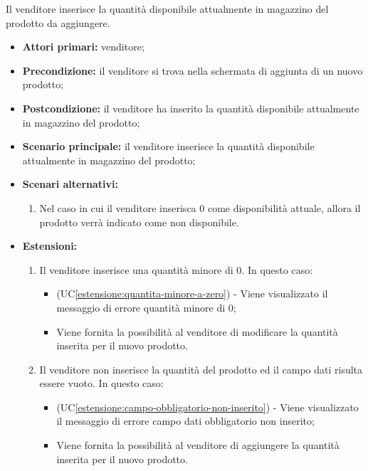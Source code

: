 Il venditore inserisce la quantità disponibile attualmente in magazzino del prodotto da aggiungere.
\begin{itemize}
    \item \textbf{Attori primari:} venditore;
    \item \textbf{Precondizione:} il venditore si trova nella schermata di aggiunta di un nuovo prodotto;
    \item \textbf{Postcondizione:} il venditore ha inserito la quantità disponibile attualmente in magazzino del prodotto;
    \item \textbf{Scenario principale:} il venditore inserisce la quantità disponibile attualmente in magazzino del prodotto;
    \item \textbf{Scenari alternativi:}
    \begin{enumerate}[label=\lett]
    	\item Nel caso in cui il venditore inserisca 0 come disponibilità attuale, allora il prodotto verrà indicato come non disponibile.
    \end{enumerate}
    \item \textbf{Estensioni:}
    \begin{enumerate}[label=\lett]
    	\item Il venditore inserisce una quantità minore di 0. In questo caso:
    	\begin{itemize}
    		\item (UC\ref{estensione:quantita-minore-a-zero}) - Viene visualizzato il messaggio di errore quantità minore di 0;
    		\item Viene fornita la possibilità al venditore di modificare la quantità inserita per il nuovo prodotto.
    	\end{itemize}
    	\item Il venditore non inserisce la quantità del prodotto ed il campo dati risulta essere vuoto. In questo caso:
    	\begin{itemize}
    		\item (UC\ref{estensione:campo-obbligatorio-non-inserito}) - Viene visualizzato il messaggio di errore campo dati obbligatorio non inserito;
    		\item Viene fornita la possibilità al venditore di aggiungere la quantità inserita per il nuovo prodotto.
    	\end{itemize}
    \end{enumerate}
\end{itemize}

\label{aggiunta-prodotto.foto}

